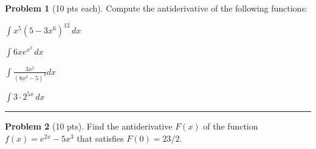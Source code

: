 \documentclass[12pt]{article}
\theoremstyle{definition}
\newtheorem{problem}{Problem}
\begin{document}
\bigskip
\begin{problem}[10 pts each]
Compute the antiderivative of the following functions:
\item $\displaystyle{\int x^5 (5 - 3x^6)^{12}\, dx}$
\vspace{3.5cm}
\item $\displaystyle{\int  6x e^{x^2} \, dx}$
\vspace{3.5cm}
\item $\displaystyle{\int \frac{3x^2}{(8x^3-5)^3} dx}$
\vspace{3.5cm}
\item $\displaystyle{\int 3 \cdot 2^{5x}\, dx}$
\vspace{2.5cm}
\end{problem}
\hrule

\begin{problem}[10 pts]
Find the antiderivative $F(x)$ of the function $f(x) = e^{2x}  - 5x^3$ that satisfies $F(0)=23/2$.
\end{problem}
\end{document}
